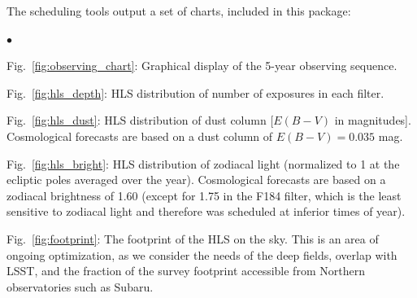 The scheduling tools output a set of charts, included in this package:
\begin{list}{$\bullet$}{}
\item
Fig.~\ref{fig:observing_chart}: Graphical display of the 5-year observing sequence.
\item
Fig.~\ref{fig:hls_depth}: HLS distribution of number of exposures in each filter.
\item
Fig.~\ref{fig:hls_dust}: HLS distribution of dust column [$E(B-V)$ in magnitudes]. Cosmological forecasts are based on a dust column of $E(B-V)=0.035$ mag.
\item
Fig.~\ref{fig:hls_bright}: HLS distribution of zodiacal light (normalized to 1 at the ecliptic poles averaged over the year). Cosmological forecasts are based on a zodiacal brightness of 1.60 (except for 1.75 in the F184 filter, which is the least sensitive to zodiacal light and therefore was scheduled at inferior times of year).
\item
Fig.~\ref{fig:footprint}: The footprint of the HLS on the sky. This is an area of ongoing optimization, as we consider the needs of the deep fields, overlap with LSST, and the fraction of the survey footprint accessible from Northern observatories such as Subaru.
\end{list}

